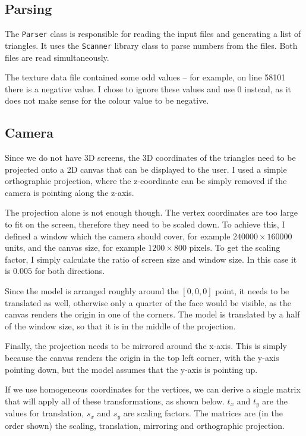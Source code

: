 \documentclass[]{article}
\begin{document}
\subsection{Parsing}

The \texttt{Parser} class is responsible for reading the input files and generating a list of triangles. It uses the \texttt{Scanner} library class to parse numbers from the files. Both files are read simultaneously.

The texture data file contained some odd values -- for example, on line 58101 there is a negative value. I chose to ignore these values and use 0 instead, as it does not make sense for the colour value to be negative.

\subsection{Camera}

Since we do not have 3D screens, the 3D coordinates of the triangles need to be projected onto a 2D canvas that can be displayed to the user. I used a simple orthographic projection, where the z-coordinate can be simply removed if the camera is pointing along the z-axis.

The projection alone is not enough though. The vertex coordinates are too large to fit on the screen, therefore they need to be scaled down. To achieve this, I defined a window which the camera should cover, for example $240000 \times 160000$ units, and the canvas size, for example $1200 \times 800$ pixels. To get the scaling factor, I simply calculate the ratio of screen size and window size. In this case it is $0.005$ for both directions.

Since the model is arranged roughly around the $[0, 0, 0]$ point, it needs to be translated as well, otherwise only a quarter of the face would be visible, as the canvas renders the origin in one of the corners. The model is translated by a half of the window size, so that it is in the middle of the projection.

Finally, the projection needs to be mirrored around the x-axis. This is simply because the canvas renders the origin in the top left corner, with the y-axis pointing down, but the model assumes that the y-axis is pointing up.

If we use homogeneous coordinates for the vertices, we can derive a single matrix that will apply all of these transformations, as shown below. $t_x$ and $t_y$ are the values for translation, $s_x$ and $s_y$ are scaling factors. The matrices are (in the order shown) the scaling, translation, mirroring and orthographic projection.
\end{document}
